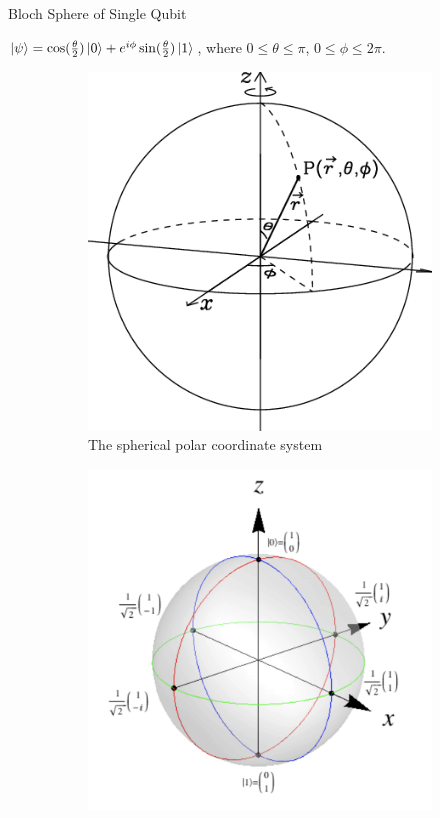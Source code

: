 \documentclass{beamer}
\begin{document}
\begin{frame}{Bloch Sphere of Single Qubit}
  {\tiny
    $\ket{\psi} = \cos(\frac{\theta}2)\ket{0}+e^{i\phi}\sin(\frac{\theta}2)\ket{1}$, where $0\leqslant\theta\leqslant\pi$, $0\leqslant\phi\leqslant2\pi$.
    \begin{figure}
      \centering
      \begin{subfigure}[b]{0.5\textwidth}
        \centering
        \includegraphics[scale=0.2]{figures/The-spherical-polar-coordinate-system}
        \caption{The spherical polar coordinate system\tiny\cite{sphericalpolarcoordinate}}
      \end{subfigure}
      \hfill
      \begin{subfigure}[b]{0.5\textwidth}
        \centering
        \includegraphics[scale=0.24]{figures/singlequbitstates}

\end{subfigure}
\end{figure}}
\end{frame}
\end{document}
